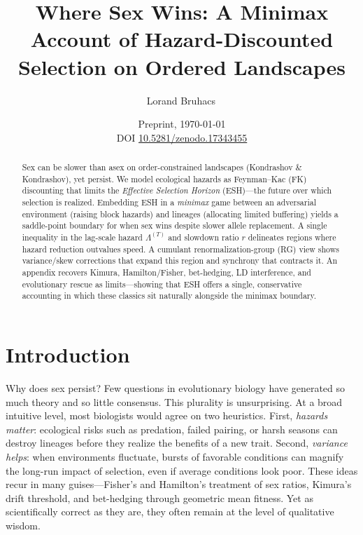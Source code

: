 \documentclass[11pt]{article}
\title{Where Sex Wins: A Minimax Account of Hazard-Discounted Selection on Ordered Landscapes}
\author{Lorand Bruhacs\,\orcidlink{0009-0004-6751-0715}}
\date{\normalsize Preprint, \today \\ DOI \href{https://doi.org/10.5281/zenodo.17343455}{10.5281/zenodo.17343455}}
\theoremstyle{upright}
\newcommand{\horizon}{\Lambda}
\begin{document}
\maketitle

\begin{abstract}
Sex can be slower than asex on order-constrained landscapes (Kondrashov \& Kondrashov), yet persist. We model ecological hazards as Feynman--Kac (FK) discounting that limits the \emph{Effective Selection Horizon} (ESH)---the future over which selection is realized. Embedding ESH in a \emph{minimax} game between an adversarial environment (raising block hazards) and lineages (allocating limited buffering) yields a saddle-point boundary for when sex wins despite slower allele replacement. A single inequality in the lag-scale hazard $\horizon^{(T)}$ and slowdown ratio $r$ delineates regions where hazard reduction outvalues speed. A cumulant renormalization-group (RG) view shows variance/skew corrections that expand this region and synchrony that contracts it. An appendix recovers Kimura, Hamilton/Fisher, bet-hedging, LD interference, and evolutionary rescue as limits—showing that ESH offers a single, conservative accounting in which these classics sit naturally alongside the minimax boundary.
\end{abstract}

\tableofcontents

\section{Introduction}
\label{sec:intro}

Why does sex persist? Few questions in evolutionary biology have generated so
much theory and so little consensus. This plurality is unsurprising. At a broad intuitive level, most biologists
would agree on two heuristics. First, \emph{hazards matter}: ecological risks
such as predation, failed pairing, or harsh seasons can destroy lineages before
they realize the benefits of a new trait. Second, \emph{variance helps}: when
environments fluctuate, bursts of favorable conditions can magnify the long-run
impact of selection, even if average conditions look poor. These ideas recur in
many guises---Fisher’s and Hamilton’s treatment of sex ratios, Kimura’s drift
threshold, and bet-hedging through geometric mean fitness. Yet as scientifically
correct as they are, they often remain at the level of qualitative wisdom.
\end{document}
